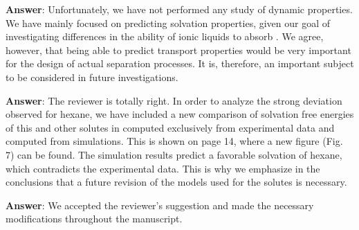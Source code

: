 \documentclass[]{article}
\begin{document}
\textbf{Answer}: Unfortunately, we have not performed any study of dynamic properties.
We have mainly focused on predicting solvation properties, given our goal of investigating differences in the ability of ionic liquids to absorb .
We agree, however, that being able to predict transport properties would be very important for the design of actual separation processes.
It is, therefore, an important subject to be considered in future investigations.

{\color{blue}{3. The results for the simulated solvation free energies of benzene, hexane, and water showed relatively large deviations from experimental data in the order of 10\%, while the results for ethanol match. However, for the infinite-dilution activity coefficient of these solutes in the IL [emim][B(CN)4], hexane deviates significantly stronger than benzene, ethanol, and water. It would be interesting to discuss in some more detail why these different trends can be found by considering, for example, the force fields of the pure solute and the mixing rules for the binary mixtures. For sure, it seems that the authors will continue such investigations in their future studies.}}

\textbf{Answer}: The reviewer is totally right.
In order to analyze the strong deviation observed for hexane, we have included a new comparison of solvation free energies of this and other solutes in \ce{[emim][B(CN)_4]} computed exclusively from experimental data and computed from simulations.
This is shown on page 14, where a new figure (Fig. 7) can be found.
The simulation results predict a favorable solvation of hexane, which contradicts the experimental data.
This is why we emphasize in the conclusions that a future revision of the models used for the solutes is necessary.

{\color{blue}{4. For the specification of the pressure, the symbol “p” instead of “P” should be used. Furthermore, the unit of the pressure should be given in “MPa” instead of “atm."}}

\textbf{Answer}: We accepted the reviewer's suggestion and made the necessary modifications throughout the manuscript.



\end{document}
